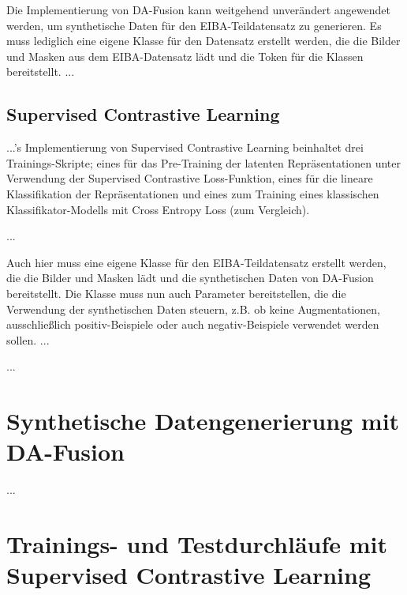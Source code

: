 Die Implementierung von DA-Fusion kann weitgehend unverändert angewendet werden, um synthetische Daten für den EIBA-Teildatensatz zu generieren. Es muss lediglich eine eigene Klasse für den Datensatz erstellt werden, die die Bilder und Masken aus dem EIBA-Datensatz lädt und die Token für die Klassen bereitstellt. ...

\subsection{Supervised Contrastive Learning}


...'s Implementierung von Supervised Contrastive Learning beinhaltet drei Trainings-Skripte; eines für das Pre-Training der latenten Repräsentationen unter Verwendung der Supervised Contrastive Loss-Funktion, eines für die lineare Klassifikation der Repräsentationen und eines zum Training eines klassischen Klassifikator-Modells mit Cross Entropy Loss (zum Vergleich).

...

Auch hier muss eine eigene Klasse für den EIBA-Teildatensatz erstellt werden, die die Bilder und Masken lädt und die synthetischen Daten von DA-Fusion bereitstellt. Die Klasse muss nun auch Parameter bereitstellen, die die Verwendung der synthetischen Daten steuern, z.B. ob keine Augmentationen, ausschließlich positiv-Beispiele oder auch negativ-Beispiele verwendet werden sollen. ...

...

\section{Synthetische Datengenerierung mit DA-Fusion}


...

\section{Trainings- und Testdurchläufe mit Supervised Contrastive Learning}

